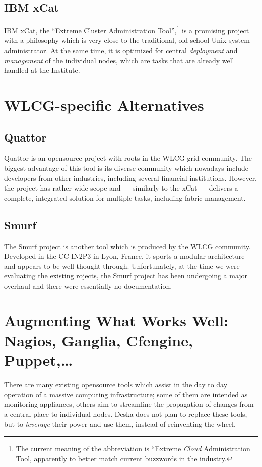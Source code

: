 \documentclass[deska]{subfiles}
\begin{document}
\subsection{IBM xCat}

IBM xCat, the ``Extreme Cluster Administration Tool'',\footnote{The current meaning of the abbreviation is ``Extreme
{\em Cloud} Administration Tool, apparently to better match current buzzwords in the industry.} is a promising project
with a philosophy which is very close to the traditional, old-school Unix system administrator.  At the same time, it is
optimized for central {\em deployment} and {\em management} of the individual nodes, which are tasks that are already
well handled at the Institute.


\section{WLCG-specific Alternatives}

\subsection{Quattor}

Quattor is an opensource project with roots in the WLCG grid community.  The biggest advantage of this tool is its
diverse community which nowadays include developers from other industries, including several financial institutions.
However, the project has rather wide scope and --- similarly to the xCat --- delivers a complete, integrated solution
for multiple tasks, including fabric management.

\subsection{Smurf}

The Smurf project is another tool which is produced by the WLCG community.  Developed in the CC-IN2P3 in Lyon, France,
it sports a modular architecture and appears to be well thought-through.  Unfortunately, at the time we were evaluating
the existing rojects, the Smurf project has been undergoing a major overhaul and there were essentially no
documentation.

\section{Augmenting What Works Well: Nagios, Ganglia, Cfengine, Puppet,\ldots}

There are many existing opensource tools which assist in the day to day operation of a massive computing infrastructure;
some of them are intended as monitoring appliances, others aim to streamline the propagation of changes from a central
place to individual nodes.  Deska does not plan to replace these tools, but to {\em leverage} their power and use them,
instead of reinventing the wheel.
\end{document}
